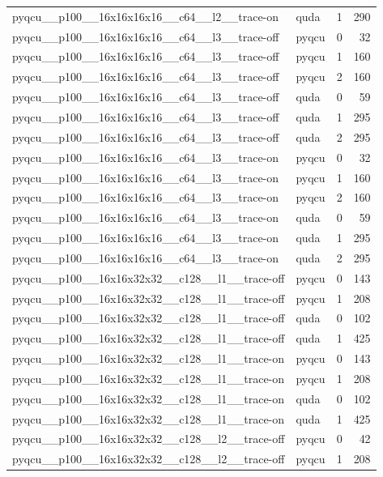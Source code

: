 \begin{table}[htbp]
\begin{tabular}{@{}llrr@{}}
pyqcu\_\_p100\_\_16x16x16x16\_\_c64\_\_l2\_\_trace-on & quda & 1 & 290 \\
pyqcu\_\_p100\_\_16x16x16x16\_\_c64\_\_l3\_\_trace-off & pyqcu & 0 & 32 \\
pyqcu\_\_p100\_\_16x16x16x16\_\_c64\_\_l3\_\_trace-off & pyqcu & 1 & 160 \\
pyqcu\_\_p100\_\_16x16x16x16\_\_c64\_\_l3\_\_trace-off & pyqcu & 2 & 160 \\
pyqcu\_\_p100\_\_16x16x16x16\_\_c64\_\_l3\_\_trace-off & quda & 0 & 59 \\
pyqcu\_\_p100\_\_16x16x16x16\_\_c64\_\_l3\_\_trace-off & quda & 1 & 295 \\
pyqcu\_\_p100\_\_16x16x16x16\_\_c64\_\_l3\_\_trace-off & quda & 2 & 295 \\
pyqcu\_\_p100\_\_16x16x16x16\_\_c64\_\_l3\_\_trace-on & pyqcu & 0 & 32 \\
pyqcu\_\_p100\_\_16x16x16x16\_\_c64\_\_l3\_\_trace-on & pyqcu & 1 & 160 \\
pyqcu\_\_p100\_\_16x16x16x16\_\_c64\_\_l3\_\_trace-on & pyqcu & 2 & 160 \\
pyqcu\_\_p100\_\_16x16x16x16\_\_c64\_\_l3\_\_trace-on & quda & 0 & 59 \\
pyqcu\_\_p100\_\_16x16x16x16\_\_c64\_\_l3\_\_trace-on & quda & 1 & 295 \\
pyqcu\_\_p100\_\_16x16x16x16\_\_c64\_\_l3\_\_trace-on & quda & 2 & 295 \\
pyqcu\_\_p100\_\_16x16x32x32\_\_c128\_\_l1\_\_trace-off & pyqcu & 0 & 143 \\
pyqcu\_\_p100\_\_16x16x32x32\_\_c128\_\_l1\_\_trace-off & pyqcu & 1 & 208 \\
pyqcu\_\_p100\_\_16x16x32x32\_\_c128\_\_l1\_\_trace-off & quda & 0 & 102 \\
pyqcu\_\_p100\_\_16x16x32x32\_\_c128\_\_l1\_\_trace-off & quda & 1 & 425 \\
pyqcu\_\_p100\_\_16x16x32x32\_\_c128\_\_l1\_\_trace-on & pyqcu & 0 & 143 \\
pyqcu\_\_p100\_\_16x16x32x32\_\_c128\_\_l1\_\_trace-on & pyqcu & 1 & 208 \\
pyqcu\_\_p100\_\_16x16x32x32\_\_c128\_\_l1\_\_trace-on & quda & 0 & 102 \\
pyqcu\_\_p100\_\_16x16x32x32\_\_c128\_\_l1\_\_trace-on & quda & 1 & 425 \\
pyqcu\_\_p100\_\_16x16x32x32\_\_c128\_\_l2\_\_trace-off & pyqcu & 0 & 42 \\
pyqcu\_\_p100\_\_16x16x32x32\_\_c128\_\_l2\_\_trace-off & pyqcu & 1 & 208 \\

\end{tabular}
\end{table}
